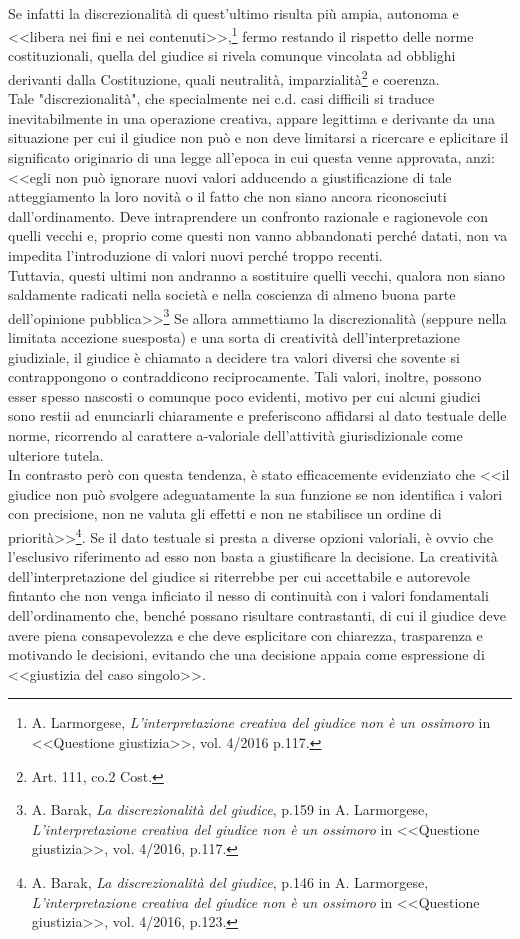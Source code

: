 \\Se infatti la discrezionalità di quest'ultimo risulta più ampia, autonoma e <<libera nei fini e nei contenuti>>,\footnote{A. Larmorgese, \textit{L’interpretazione creativa del giudice non è un ossimoro} in <<Questione giustizia>>, vol. 4/2016 p.117.} fermo restando il rispetto delle norme costituzionali, quella del giudice si rivela comunque vincolata ad obblighi derivanti dalla Costituzione, quali neutralità, imparzialità\footnote{Art. 111, co.2 Cost.} e coerenza.
\\Tale "discrezionalità", che specialmente nei c.d. casi difficili si traduce inevitabilmente in una operazione creativa, appare legittima e derivante da una situazione per cui il giudice non può e non deve limitarsi a ricercare e eplicitare il significato originario di una legge all'epoca in cui questa venne approvata, anzi: <<egli non può ignorare nuovi valori adducendo a giustificazione di tale atteggiamento la loro novità o il fatto che non siano ancora riconosciuti dall'ordinamento. Deve intraprendere un confronto razionale e ragionevole con quelli vecchi e, proprio come questi non vanno abbandonati perché datati, non va impedita l'introduzione di valori nuovi perché troppo recenti.
\\Tuttavia, questi ultimi non andranno a sostituire quelli vecchi, qualora non siano saldamente radicati nella società e nella coscienza di almeno buona parte dell'opinione pubblica>>\footnote{A. Barak, \textit{La discrezionalità del giudice}, p.159 in A. Larmorgese, \textit{L’interpretazione creativa del giudice non è un ossimoro} in <<Questione giustizia>>, vol. 4/2016, p.117. }
Se allora ammettiamo la discrezionalità (seppure nella limitata accezione suesposta) e una sorta di creatività dell'interpretazione giudiziale, il giudice è chiamato a decidere tra valori diversi che sovente si contrappongono o contraddicono reciprocamente. 
Tali valori, inoltre, possono esser spesso nascosti o comunque poco evidenti, motivo per cui alcuni giudici sono restii ad enunciarli chiaramente e preferiscono affidarsi al dato testuale delle norme, ricorrendo al carattere a-valoriale dell'attività giurisdizionale come ulteriore tutela. 
\\In contrasto però con questa tendenza, è stato efficacemente evidenziato che <<il giudice non può svolgere adeguatamente la sua funzione se non identifica i valori con precisione, non ne valuta gli effetti e non ne stabilisce un ordine di priorità>>\footnote{A. Barak, \textit{La discrezionalità del giudice}, p.146 in A. Larmorgese, \textit{L’interpretazione creativa del giudice non è un ossimoro} in <<Questione giustizia>>, vol. 4/2016, p.123. }.
Se il dato testuale si presta a diverse opzioni valoriali, è ovvio che l'esclusivo riferimento ad esso non basta a giustificare la decisione. 
La creatività dell’interpretazione del giudice si riterrebbe per cui accettabile e autorevole fintanto che non venga inficiato il nesso di continuità con i valori fondamentali dell’ordinamento che, benché possano risultare contrastanti, di cui il giudice deve avere piena consapevolezza e che deve esplicitare con chiarezza, trasparenza e motivando le decisioni, evitando che una decisione appaia come espressione di <<giustizia del caso singolo>>.

